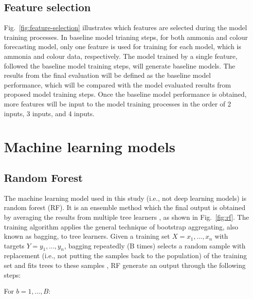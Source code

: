 \subsection{Feature selection}
Fig.~\ref{fig:feature-selection} illustrates which features are selected during the model training processes. In baseline model trianing steps, for both ammonia and colour forecasting model, only one feature is used for training for each model, which is ammonia and colour data, respectively. The model trained by a single feature, followed the baseline model training steps, will generate baseline models. The results from the final evaluation will be defined as the baseline model performance, which will be compared with the model evaluated results from proposed model training steps. Once the baseline model performance is obtained, more features will be input to the model training processes in the order of 2 inputs, 3 inputs, and 4 inputs.

\section{Machine learning models}
\subsection{Random Forest}
The machine learning model used in this study (i.e., not deep learning models) is random forest (RF). It is an ensemble method which the final output is obtained by averaging the results from multiple tree learners \citep{wangMachineLearningFramework2021}, as shown in Fig.~\ref{fig:rf}. The training algorithm applies the general technique of bootstrap aggregating, also known as bagging, to tree learners. Given a training set $X = x_1, ..., x_n$ with targets $Y = y_1, ..., y_n$, bagging repeatedly (B times) selects a random sample with replacement (i.e., not putting the samples back to the population) of the training set and fits trees to these samples \citep{wikipediaRandomForest2022}, RF generate an output through the following steps:

For $b=1, ..., B:$

